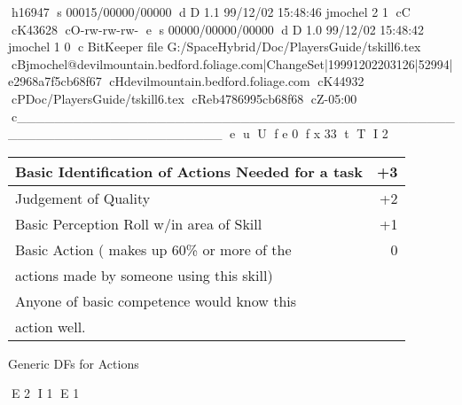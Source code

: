 h16947
s 00015/00000/00000
d D 1.1 99/12/02 15:48:46 jmochel 2 1
cC
cK43628
cO-rw-rw-rw-
e
s 00000/00000/00000
d D 1.0 99/12/02 15:48:42 jmochel 1 0
c BitKeeper file G:/SpaceHybrid/Doc/PlayersGuide/tskill6.tex
cBjmochel@devilmountain.bedford.foliage.com|ChangeSet|19991202203126|52994|e2968a7f5cb68f67
cHdevilmountain.bedford.foliage.com
cK44932
cPDoc/PlayersGuide/tskill6.tex
cReb4786995cb68f68
cZ-05:00
c______________________________________________________________________
e
u
U
f e 0
f x 33
t
T
I 2
\begin{SHTable}
	\begin{tabular}{lr}
	Basic Identification of Actions Needed for a task & +3	\\ 
\hline
	Judgement of Quality                          & +2	\\
	Basic Perception Roll w/in area of Skill      & +1	\\
	Basic Action ( makes up 60\% or more of the   & 0	\\  
	actions made by someone using this skill)     &      \\
	Anyone of basic competence would know this   &      \\
	action well.                                  &      \\
	\end{tabular}
    \caption{Generic DFs for Actions}\label{Table:GenericDFs}
\end{SHTable}
E 2
I 1
E 1
